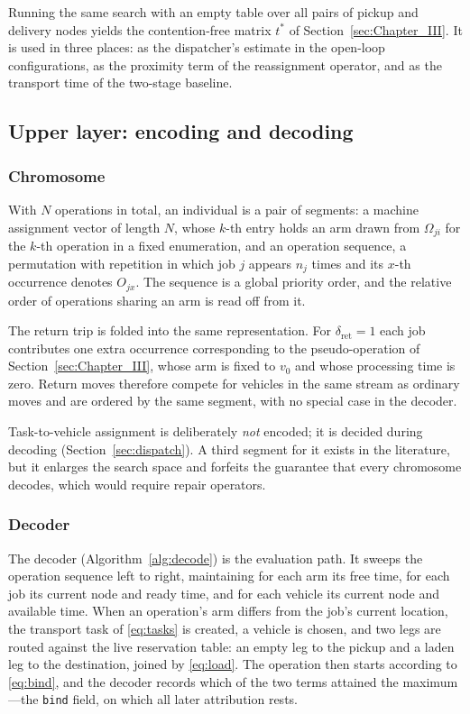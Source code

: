 \documentclass[manuscript,screen,review]{acmart}
\begin{document}
Running the same search with an empty table over all pairs of pickup and
delivery nodes yields the contention-free matrix $t^{*}$ of
Section~\ref{sec:Chapter_III}. It is used in three places: as the dispatcher's
estimate in the open-loop configurations, as the proximity term of the
reassignment operator, and as the transport time of the two-stage baseline.

\subsection{Upper layer: encoding and decoding}
\label{sec:upper}

\subsubsection{Chromosome}
With $N$ operations in total, an individual is a pair of segments: a machine
assignment vector of length $N$, whose $k$-th entry holds an arm drawn from
$\Omega_{ji}$ for the $k$-th operation in a fixed enumeration, and an operation
sequence, a permutation with repetition in which job $j$ appears $n_j$ times
and its $x$-th occurrence denotes $O_{jx}$. The sequence is a global priority
order, and the relative order of operations sharing an arm is read off from it.

The return trip is folded into the same representation. For
$\delta_{\mathrm{ret}}=1$ each job contributes one extra occurrence
corresponding to the pseudo-operation of Section~\ref{sec:Chapter_III}, whose
arm is fixed to $v_0$ and whose processing time is zero. Return moves therefore
compete for vehicles in the same stream as ordinary moves and are ordered by
the same segment, with no special case in the decoder.

Task-to-vehicle assignment is deliberately \emph{not} encoded; it is decided
during decoding (Section~\ref{sec:dispatch}). A third segment for it exists in
the literature, but it enlarges the search space and forfeits the guarantee
that every chromosome decodes, which would require repair operators.

\subsubsection{Decoder}
The decoder (Algorithm~\ref{alg:decode}) is the evaluation path. It sweeps the
operation sequence left to right, maintaining for each arm its free time, for
each job its current node and ready time, and for each vehicle its current node
and available time. When an operation's arm differs from the job's current
location, the transport task of \eqref{eq:tasks} is created, a vehicle is
chosen, and two legs are routed against the live reservation table: an empty
leg to the pickup and a laden leg to the destination, joined by
\eqref{eq:load}. The operation then starts according to \eqref{eq:bind}, and
the decoder records which of the two terms attained the maximum---the
\texttt{bind} field, on which all later attribution rests.
\end{document}
